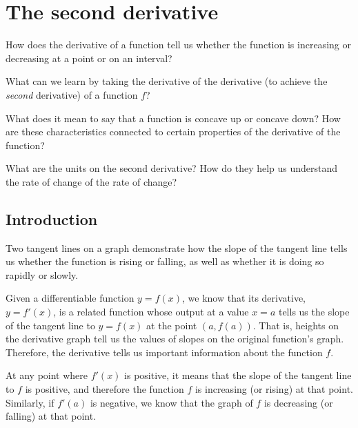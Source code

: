 \section{The second derivative} \label{S:2.3.SecondD}

\begin{goals}
\item How does the derivative of a function tell us whether the function is increasing or decreasing at a point or on an interval?
\item What can we learn by taking the derivative of the derivative (to achieve the \emph{second} derivative) of a function $f$?
\item What does it mean to say that a function is concave up or concave down?  How are these characteristics connected to certain properties of the derivative of the function?
\item What are the units on the second derivative?  How do they help us understand the rate of change of the rate of change?
\end{goals}

\subsection*{Introduction}

\begin{marginfigure}[8cm] %
\caption{Two tangent lines on a graph demonstrate how the slope of the tangent line tells us whether the function is rising or falling, as well as whether it is doing so rapidly or slowly.}\label{fig:2-3_Intro}
\end{marginfigure}

Given a differentiable function $y= f(x)$, we know that its derivative, $y = f'(x)$, is a related function whose output at a value $x=a$ tells us the slope of the tangent line to $y = f(x)$ at the point $(a,f(a))$.  That is, heights on the derivative graph tell us the values of slopes on the original function's graph.  Therefore, the derivative tells us important information about the function $f$.  

At any point where $f'(x)$ is positive, it means that the slope of the tangent line to $f$ is positive, and therefore the function $f$ is increasing (or rising)  at that point.  Similarly, if $f'(a)$ is negative, we know that the graph of $f$ is decreasing  (or falling) at that point.   

